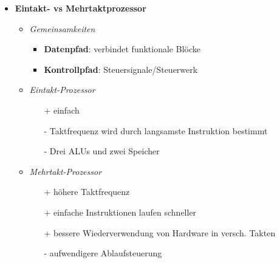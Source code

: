 \begin{itemize}
        \item \textbf{Eintakt- vs Mehrtaktprozessor}
            \begin{itemize}
                \item \textit{Gemeinsamkeiten}
                    \begin{itemize}
                        \item \textbf{Datenpfad}: verbindet funktionale Blöcke
                        \item \textbf{Kontrollpfad}: Steuersignale/Steuerwerk
                    \end{itemize}
                \item \textit{Eintakt-Prozessor}
                    \begin{itemize}
                        \item[+] einfach
                        \item[-] Taktfrequenz wird durch langsamste Instruktion bestimmt
                        \item[-] Drei ALUs und zwei Speicher  
                    \end{itemize}
                \item \textit{Mehrtakt-Prozessor}
                    \begin{itemize}
                        \item[+] höhere Taktfrequenz
                        \item[+] einfache Instruktionen laufen schneller
                        \item[+] bessere Wiederverwendung von Hardware in versch. Takten
                        \item[-] aufwendigere Ablaufsteuerung   
                    \end{itemize}
            \end{itemize}
    \end{itemize}

\pagebreak

